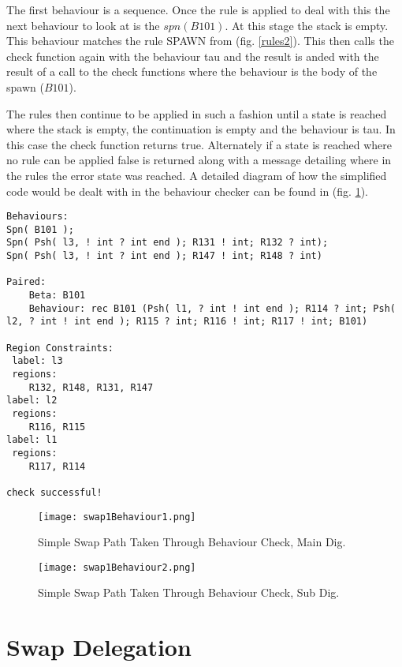 The first behaviour is a sequence. Once the rule is applied to deal with this the next behaviour to look at is the $spn(B101)$. At this stage the stack is empty. This behaviour matches the rule SPAWN from (fig. \ref{rules2}). This then calls the check function again with the behaviour tau and the result is anded with the result of a call to the check functions where the behaviour is the body of the spawn ($B101$). 

The rules then continue to be applied in such a fashion until a state is reached where the stack is empty, the continuation is empty and the behaviour is tau. In this case the check function returns true. Alternately if a state is reached where no rule can be applied false is returned along with a message detailing where in the rules the error state was reached. A detailed diagram of how the simplified code would be dealt with in the behaviour checker can be found in (fig. \ref{path}).

\begin{lstlisting}
Behaviours:
Spn( B101 );
Spn( Psh( l3, ! int ? int end ); R131 ! int; R132 ? int);
Spn( Psh( l3, ! int ? int end ); R147 ! int; R148 ? int)

Paired: 
	Beta: B101 
	Behaviour: rec B101 (Psh( l1, ? int ! int end ); R114 ? int; Psh( l2, ? int ! int end ); R115 ? int; R116 ! int; R117 ! int; B101)

Region Constraints:
 label: l3
 regions:
	R132, R148, R131, R147
label: l2
 regions:
	R116, R115
label: l1
 regions:
	R117, R114

check successful!
\end{lstlisting}

\begin{figure}
\texttt{[image: swap1Behaviour1.png]}
\caption{Simple Swap Path Taken Through Behaviour Check, Main Dig.}
\label{path}
\end{figure}

\begin{figure}
\texttt{[image: swap1Behaviour2.png]}
\caption{Simple Swap Path Taken Through Behaviour Check, Sub Dig.}
\label{path2}
\end{figure}

\FloatBarrier
\section{Swap Delegation}

